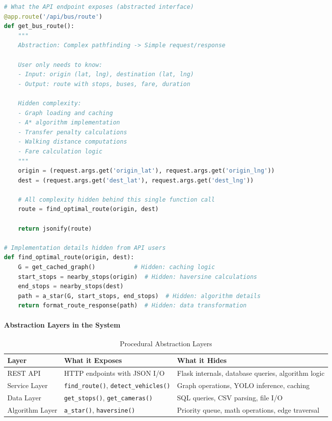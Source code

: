 \begin{lstlisting}[language=Python, caption={Procedural Abstraction - Clean API Interface}]
# What the API endpoint exposes (abstracted interface)
@app.route('/api/bus/route')
def get_bus_route():
    """
    Abstraction: Complex pathfinding -> Simple request/response
    
    User only needs to know:
    - Input: origin (lat, lng), destination (lat, lng)
    - Output: route with stops, buses, fare, duration
    
    Hidden complexity:
    - Graph loading and caching
    - A* algorithm implementation
    - Transfer penalty calculations
    - Walking distance computations
    - Fare calculation logic
    """
    origin = (request.args.get('origin_lat'), request.args.get('origin_lng'))
    dest = (request.args.get('dest_lat'), request.args.get('dest_lng'))
    
    # All complexity hidden behind this single function call
    route = find_optimal_route(origin, dest)
    
    return jsonify(route)

# Implementation details hidden from API users
def find_optimal_route(origin, dest):
    G = get_cached_graph()           # Hidden: caching logic
    start_stops = nearby_stops(origin)  # Hidden: haversine calculations
    end_stops = nearby_stops(dest)
    path = a_star(G, start_stops, end_stops)  # Hidden: algorithm details
    return format_route_response(path)  # Hidden: data transformation
\end{lstlisting}

\paragraph{Abstraction Layers in the System}

\begin{table}[H]
    \centering
    \renewcommand{\arraystretch}{1.2}
    \begin{tabularx}{\textwidth}{|l|X|X|}
        \hline
        \textbf{Layer} & \textbf{What it Exposes} & \textbf{What it Hides} \\
        \hline
        REST API & HTTP endpoints with JSON I/O & Flask internals, database queries, algorithm logic \\
        \hline
        Service Layer & \texttt{find\_route()}, \texttt{detect\_vehicles()} & Graph operations, YOLO inference, caching \\
        \hline
        Data Layer & \texttt{get\_stops()}, \texttt{get\_cameras()} & SQL queries, CSV parsing, file I/O \\
        \hline
        Algorithm Layer & \texttt{a\_star()}, \texttt{haversine()} & Priority queue, math operations, edge traversal \\
        \hline
    \end{tabularx}
    \caption{Procedural Abstraction Layers}
\end{table}

